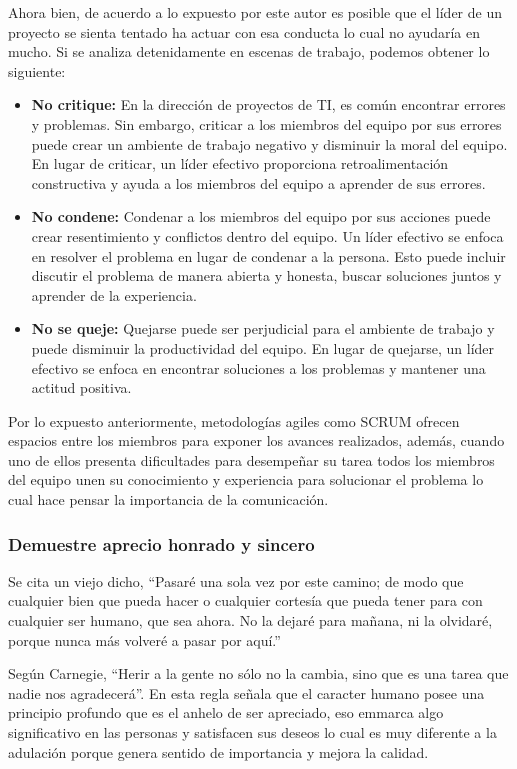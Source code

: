 \documentclass[journal]{IEEEtran}
\begin{document}
Ahora bien, de acuerdo a lo expuesto por este autor es posible que el líder de un proyecto se sienta tentado ha actuar con esa conducta lo cual no ayudaría en mucho. Si se analiza detenidamente en escenas de trabajo, podemos obtener lo siguiente:

\begin{itemize}
	\item \textbf{No critique:} En la dirección de proyectos de TI, es común encontrar errores y problemas. Sin embargo, criticar a los miembros del equipo por sus errores puede crear un ambiente de trabajo negativo y disminuir la moral del equipo. En lugar de criticar, un líder efectivo proporciona retroalimentación constructiva y ayuda a los miembros del equipo a aprender de sus errores.
	\item \textbf{No condene:} Condenar a los miembros del equipo por sus acciones puede crear resentimiento y conflictos dentro del equipo. Un líder efectivo se enfoca en resolver el problema en lugar de condenar a la persona. Esto puede incluir discutir el problema de manera abierta y honesta, buscar soluciones juntos y aprender de la experiencia.
	\item \textbf{No se queje: }Quejarse puede ser perjudicial para el ambiente de trabajo y puede disminuir la productividad del equipo. En lugar de quejarse, un líder efectivo se enfoca en encontrar soluciones a los problemas y mantener una actitud positiva.
\end{itemize}

Por lo expuesto anteriormente, metodologías agiles como SCRUM ofrecen espacios entre los miembros para exponer los avances realizados, además, cuando uno de ellos presenta dificultades para desempeñar su tarea todos los miembros del equipo unen su conocimiento y experiencia para solucionar el problema lo cual hace pensar la importancia de la comunicación.

\subsubsection{Demuestre aprecio honrado y sincero}
Se cita un viejo dicho, “Pasaré una sola vez por este camino; de modo que cualquier bien que pueda hacer o cualquier cortesía que pueda tener para con cualquier ser humano, que sea ahora. No la dejaré para mañana, ni la olvidaré, porque nunca más volveré a pasar por aquí.”

Según Carnegie, “Herir a la gente no sólo no la cambia, sino que es una tarea que nadie nos agradecerá”. En esta regla señala que el caracter humano posee una principio profundo que es el anhelo de ser apreciado, eso emmarca algo significativo en las personas y satisfacen sus deseos lo cual es muy diferente a la adulación porque genera sentido de importancia y mejora la calidad.
\end{document}

